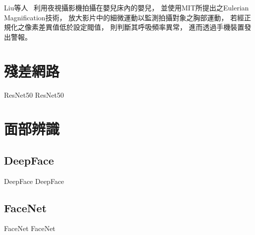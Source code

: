 \documentclass[class=NCU_thesis, crop=false]{standalone}
\begin{document}
Liu等人~\cite{liuVideoBasedIoTBabyMonitorForSIDSPrevention2017}
利用夜視攝影機拍攝在嬰兒床內的嬰兒，
並使用MIT所提出之Eulerian Magnification技術，
放大影片中的細微運動以監測拍攝對象之胸部運動，
若經正規化之像素差異值低於設定閥值，
則判斷其呼吸頻率異常，
進而透過手機裝置發出警報。






\section{殘差網路}
ResNet50 ResNet50

\section{面部辨識}
\subsection{DeepFace}
DeepFace DeepFace

\subsection{FaceNet}
FaceNet FaceNet
\end{document}
